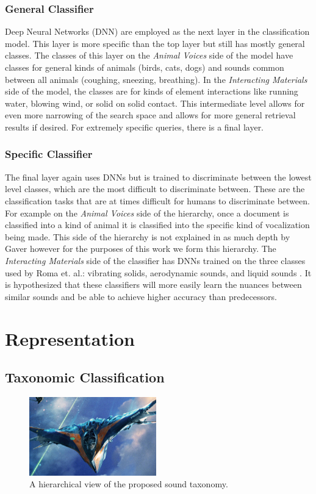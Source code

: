 \subsubsection{General Classifier}
Deep Neural Networks (DNN) are employed as the next layer in the classification model. This layer is more specific than the top layer but still has mostly general classes. The classes of this layer on the \textit{Animal Voices} side of the model have classes for general kinds of animals (birds, cats, dogs) and sounds common between all animals (coughing, sneezing, breathing). In the \textit{Interacting Materials} side of the model, the classes are for kinds of element interactions like running water, blowing wind, or solid on solid contact. This intermediate level allows for even more narrowing of the search space and allows for more general retrieval results if desired. For extremely specific queries, there is a final layer.

\subsubsection{Specific Classifier}
The final layer again uses DNNs but is trained to discriminate between the lowest level classes, which are the most difficult to discriminate between. These are the classification tasks that are at times difficult for humans to discriminate between. For example on the \textit{Animal Voices} side of the hierarchy, once a document is classified into a kind of animal it is classified into the specific kind of vocalization being made. This side of the hierarchy is not explained in as much depth by Gaver however for the purposes of this work we form this hierarchy. The \textit{Interacting Materials} side of the classifier has DNNs trained on the three classes used by Roma et. al.: vibrating solids, aerodynamic sounds, and liquid sounds \cite{Roma2010}. It is hypothesized that these classifiers will more easily learn the nuances between similar sounds and be able to achieve higher accuracy than predecessors.

\section{Representation}

\subsection{Taxonomic Classification}
\begin{figure}[h!]
    \centering
    \includegraphics[width=0.49\textwidth]{figures/sound_hierarchy.jpg}
    \caption{A hierarchical view of the proposed sound taxonomy.}
    \label{fig:sound_hierarchy}
\end{figure}


